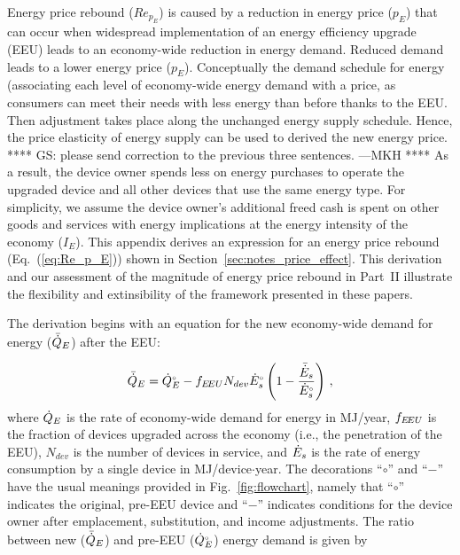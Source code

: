 

Energy price rebound ($Re_{p_E}$) is caused by a reduction 
in energy price ($p_E$)
that can occur when widespread implementation 
of an energy efficiency upgrade (EEU)
leads to an economy-wide reduction in energy demand.
Reduced demand leads 
to a lower energy price ($p_E$).
%
Conceptually the demand schedule for energy
(associating each level of economy-wide energy demand with a price, 
as consumers can meet their needs with less energy than before thanks to the EEU. 
Then adjustment takes place along the unchanged energy supply schedule.
Hence, the price elasticity of energy supply
can be used to derived the new energy price.
**** GS: please send correction to the previous three sentences. ---MKH ****
%
As a result, the device owner spends less on energy purchases
to operate the upgraded device
and all other devices that use the same energy type.
For simplicity, 
we assume the device owner's additional freed cash
is spent on other goods and services
with energy implications 
at the energy intensity of the economy ($I_E$).
This appendix derives an expression for an
energy price rebound (Eq.~(\ref{eq:Re_p_E}))
shown in Section~\ref{sec:notes_price_effect}.
This derivation and our assessment 
of the magnitude of energy price rebound
in Part~II
illustrate the flexibility and extinsibility of the framework
presented in these papers.

The derivation begins with an equation for the new economy-wide 
demand for energy ($\bar{\dot{Q}}_E$) after the EEU:

\begin{equation}
  \bar{\dot{Q}}_E = {}{\dot{Q}}^{\scriptscriptstyle \circ}_E - f_{E\!EU} N_{dev} {}{\dot{E}}^{\scriptscriptstyle \circ}_s \left( 1 - \frac{\bar{\dot{E}}_s}{{}{\dot{E}}^{\scriptscriptstyle \circ}_s} \right) \, ,
\end{equation}
%
where
$\dot{Q}_E$ is the rate of economy-wide demand for energy in MJ/year,
$f_{E\!EU}$ is the fraction of devices upgraded across the economy
(i.e., the penetration of the EEU),
$N_{dev}$ is the number of devices in service, and
$\dot{E}_s$ is the rate of energy consumption by a single device in MJ/device$\cdot$year.
The decorations ``$\circ$'' and ``$-$'' have the usual meanings
provided in Fig.~\ref{fig:flowchart}, namely that
``$\circ$'' indicates the original, pre-EEU device and
``$-$'' indicates conditions for the device owner after
emplacement, substitution, and income
adjustments.
The ratio between
new ($\bar{\dot{Q}}_E$) and
pre-EEU (${}{\dot{Q}}^{\scriptscriptstyle \circ}_E$)
energy demand is given by

